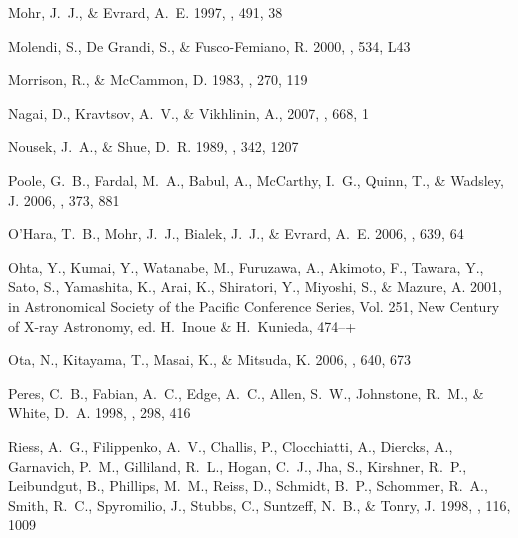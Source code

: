 \documentclass[12pt,preprint]{aastex}
\begin{document}
\begin{thebibliography}{}
{Mohr}, J.~J., \& {Evrard}, A.~E. 1997, \apj, 491, 38

{Molendi}, S., {De Grandi}, S., \& {Fusco-Femiano}, R. 2000, \apjl, 534, L43

{Morrison}, R., \& {McCammon}, D. 1983, \apj, 270, 119

{Nagai}, D., {Kravtsov}, A.~V., \& {Vikhlinin}, A., 2007, \apj, 668,
  1

{Nousek}, J.~A., \& {Shue}, D.~R. 1989, \apj, 342, 1207

{Poole}, G.~B., {Fardal}, M.~A., {Babul}, A., {McCarthy}, I.~G.,
  {Quinn}, T., \& {Wadsley}, J. 2006, \mnras, 373, 881

{O'Hara}, T.~B., {Mohr}, J.~J., {Bialek}, J.~J., \& {Evrard}, A.~E. 2006, \apj,
  639, 64

{Ohta}, Y., {Kumai}, Y., {Watanabe}, M., {Furuzawa}, A., {Akimoto}, F.,
  {Tawara}, Y., {Sato}, S., {Yamashita}, K., {Arai}, K., {Shiratori}, Y.,
  {Miyoshi}, S., \& {Mazure}, A. 2001, in Astronomical Society of the Pacific
  Conference Series, Vol. 251, New Century of X-ray Astronomy, ed. H.~{Inoue}
  \& H.~{Kunieda}, 474--+

{Ota}, N., {Kitayama}, T., {Masai}, K., \& {Mitsuda}, K. 2006, \apj, 640, 673

{Peres}, C.~B., {Fabian}, A.~C., {Edge}, A.~C., {Allen}, S.~W., {Johnstone},
  R.~M., \& {White}, D.~A. 1998, \mnras, 298, 416

{Riess}, A.~G., {Filippenko}, A.~V., {Challis}, P., {Clocchiatti}, A.,
  {Diercks}, A., {Garnavich}, P.~M., {Gilliland}, R.~L., {Hogan}, C.~J., {Jha},
  S., {Kirshner}, R.~P., {Leibundgut}, B., {Phillips}, M.~M., {Reiss}, D.,
  {Schmidt}, B.~P., {Schommer}, R.~A., {Smith}, R.~C., {Spyromilio}, J.,
  {Stubbs}, C., {Suntzeff}, N.~B., \& {Tonry}, J. 1998, \aj, 116, 1009


\end{thebibliography}
\end{document}
